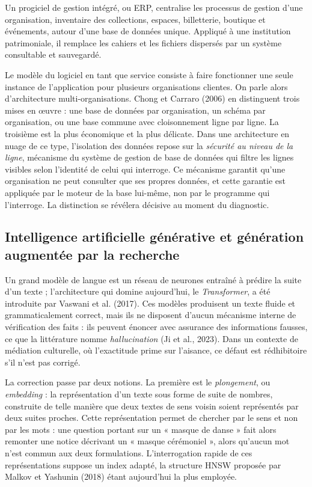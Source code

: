 Un progiciel de gestion intégré, ou ERP, centralise les processus de gestion
d'une organisation, inventaire des collections, espaces, billetterie, boutique
et événements, autour d'une base de données unique. Appliqué à une institution
patrimoniale, il remplace les cahiers et les fichiers dispersés par un système
consultable et sauvegardé.

Le modèle du logiciel en tant que service consiste à faire fonctionner une seule
instance de l'application pour plusieurs organisations clientes. On parle alors
d'architecture multi-organisations. Chong et Carraro (2006) en distinguent trois
mises en œuvre : une base de données par organisation, un schéma par
organisation, ou une base commune avec cloisonnement ligne par ligne. La
troisième est la plus économique et la plus délicate. Dans une architecture en
nuage de ce type, l'isolation des données repose sur la \emph{sécurité au niveau
de la ligne}, mécanisme du système de gestion de base de données qui filtre les
lignes visibles selon l'identité de celui qui interroge. Ce mécanisme garantit
qu'une organisation ne peut consulter que ses propres données, et cette garantie
est appliquée par le moteur de la base lui-même, non par le programme qui
l'interroge. La distinction se révélera décisive au moment du diagnostic.

\subsection{Intelligence artificielle générative et génération augmentée par la recherche}

Un grand modèle de langue est un réseau de neurones entraîné à prédire la suite
d'un texte ; l'architecture qui domine aujourd'hui, le \emph{Transformer}, a été
introduite par Vaswani et al. (2017). Ces modèles produisent un texte fluide et
grammaticalement correct, mais ils ne disposent d'aucun mécanisme interne de
vérification des faits : ils peuvent énoncer avec assurance des informations
fausses, ce que la littérature nomme \emph{hallucination} (Ji et al., 2023).
Dans un contexte de médiation culturelle, où l'exactitude prime sur l'aisance,
ce défaut est rédhibitoire s'il n'est pas corrigé.

La correction passe par deux notions. La première est le \emph{plongement}, ou
\emph{embedding} : la représentation d'un texte sous forme de suite de nombres,
construite de telle manière que deux textes de sens voisin soient représentés
par deux suites proches. Cette représentation permet de chercher par le sens et
non par les mots : une question portant sur un « masque de danse » fait alors
remonter une notice décrivant un « masque cérémoniel », alors qu'aucun mot n'est
commun aux deux formulations. L'interrogation rapide de ces représentations
suppose un index adapté, la structure HNSW proposée par Malkov et Yashunin
(2018) étant aujourd'hui la plus employée.

